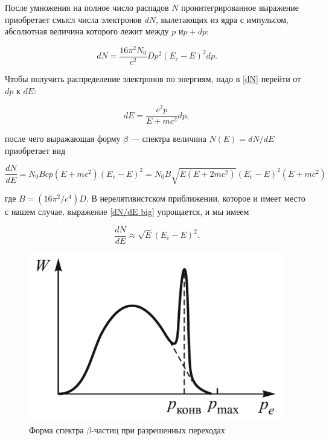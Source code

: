 \documentclass[a4paper, 12pt]{article}%
\newcommand{\be}{\ensuremath{\beta}}
\begin{document}
После умножения на полное число распадов $ N $ проинтегрированное выражение приобретает смысл числа электронов $ dN $, вылетающих из ядра с импульсом, абсолютная величина которого лежит между $ p $ и$  p + dp $:

\begin{equation}\label{dN}
dN = \dfrac{16\pi^2 N_0}{c^2}Dp^2(E_e - E)^2dp.
\end{equation}

Чтобы получить распределение электронов по энергиям, надо в \eqref{dN} перейти от $ dp $ к $ dE $:

\begin{equation}
dE = \dfrac{c^2p}{E + mc^2}dp,
\end{equation}

после чего выражающая форму $\beta$ --- спектра величина $ N(E) = dN/dE $
приобретает вид

\begin{equation}\label{dN/dE big}
\dfrac{dN}{dE} = N_0Bcp(E + mc^2)(E_e - E)^2 = N_0B\sqrt{E(E + 2mc^2)}(E_e - E)^2(E + mc^2)
\end{equation}

где $B = (16\pi^2/c^4)D$. В нерелятивистском приближении, которое и имеет место с нашем случае, выражение \eqref{dN/dE big} упрощается, и мы имеем

\begin{equation}\label{dN/dE}
\dfrac{dN}{dE} \approx \sqrt{E}(E_e - E)^2.
\end{equation}

\begin{figure}
	\includegraphics[width=\linewidth]{spektr}
	\caption{Форма спектра \be-частиц при разрешенных переходах}
	\label{ris spetr}
\end{figure}
\end{document}
